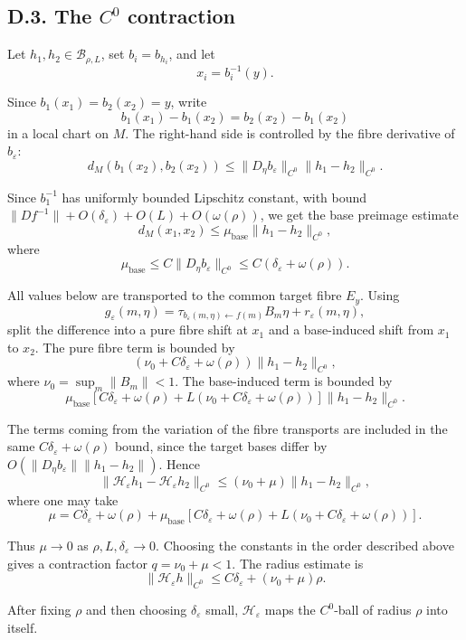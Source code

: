\documentclass[12pt,a4paper]{article}
\theoremstyle{plain}
\numberwithin{equation}{section}
\numberwithin{theorem}{section}
\begin{document}
\subsection{D.3. The $C^0$ contraction}

Let $h_1,h_2\in\mathcal B_{\rho,L}$, set $b_i=b_{h_i}$, and let
\[
x_i=b_i^{-1}(y).
\]

Since $b_1(x_1)=b_2(x_2)=y$, write
\[
b_1(x_1)-b_1(x_2)=b_2(x_2)-b_1(x_2)
\]
in a local chart on $M$. The right-hand side is controlled by the fibre derivative of $b_\varepsilon$:
\[
d_M(b_1(x_2),b_2(x_2))
\le
\|D_\eta b_\varepsilon\|_{C^0}
\|h_1-h_2\|_{C^0}.
\]

Since $b_1^{-1}$ has uniformly bounded Lipschitz constant, with bound $\|Df^{-1}\|+O(\delta_\varepsilon)+O(L)+O(\omega(\rho))$, we get the base preimage estimate
\[
d_M(x_1,x_2)
\le
\mu_{\mathrm{base}}
\|h_1-h_2\|_{C^0},
\]
where
\[
\mu_{\mathrm{base}}
\le
C\|D_\eta b_\varepsilon\|_{C^0}
\le
C(\delta_\varepsilon+\omega(\rho)).
\]

All values below are transported to the common target fibre $E_y$. Using
\[
g_\varepsilon(m,\eta)=
\tau_{b_\varepsilon(m,\eta)\leftarrow f(m)}B_m\eta+r_\varepsilon(m,\eta),
\]
split the difference into a pure fibre shift at $x_1$ and a base-induced shift from $x_1$ to $x_2$. The pure fibre term is bounded by
\[
\left(\nu_0+C\delta_\varepsilon+\omega(\rho)\right)
\|h_1-h_2\|_{C^0},
\]
where $\nu_0=\sup_m\|B_m\|<1$. The base-induced term is bounded by
\[
\mu_{\mathrm{base}}
\left[
C\delta_\varepsilon+\omega(\rho)
+L(\nu_0+C\delta_\varepsilon+\omega(\rho))
\right]
\|h_1-h_2\|_{C^0}.
\]

The terms coming from the variation of the fibre transports are included in the same $C\delta_\varepsilon+\omega(\rho)$ bound, since the target bases differ by $O(\|D_\eta b_\varepsilon\|\|h_1-h_2\|)$. Hence
\[
\|\mathcal H_\varepsilon h_1-
\mathcal H_\varepsilon h_2\|_{C^0}
\le
(\nu_0+
\mu)
\|h_1-h_2\|_{C^0},
\]
where one may take
\[
\mu
=
C\delta_\varepsilon+\omega(\rho)
+
\mu_{\mathrm{base}}
\left[
C\delta_\varepsilon+\omega(\rho)
+L(\nu_0+C\delta_\varepsilon+\omega(\rho))
\right].
\]

Thus $\mu\to0$ as $\rho,L,\delta_\varepsilon\to0$. Choosing the constants in the order described above gives a contraction factor $q=\nu_0+\mu<1$. The radius estimate is
\[
\|\mathcal H_\varepsilon h\|_{C^0}
\le
C\delta_\varepsilon+(\nu_0+\mu)\rho.
\]

After fixing $\rho$ and then choosing $\delta_\varepsilon$ small, $\mathcal H_\varepsilon$ maps the $C^0$-ball of radius $\rho$ into itself.
\end{document}
